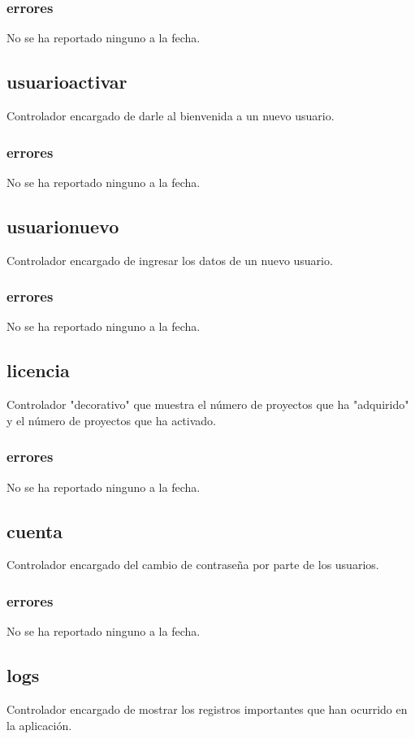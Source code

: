 \documentclass[10pt,a4paper]{book}
\begin{document}
	\subsubsection{errores}
	No se ha reportado ninguno a la fecha.

	\subsection{usuarioactivar}
	Controlador encargado de darle al bienvenida a un nuevo usuario.
	\subsubsection{errores}
	No se ha reportado ninguno a la fecha.
	
	\subsection{usuarionuevo}
	Controlador encargado de ingresar los datos de un nuevo usuario.
	\subsubsection{errores}
	No se ha reportado ninguno a la fecha.


	\subsection{licencia}
	Controlador "decorativo" que muestra el número de proyectos que ha "adquirido" y el número de proyectos que ha activado.
	\subsubsection{errores}
	No se ha reportado ninguno a la fecha.

	\subsection{cuenta}
	Controlador encargado del cambio de contraseña por parte de los usuarios.
	\subsubsection{errores}
	No se ha reportado ninguno a la fecha.

	\subsection{logs}
	Controlador encargado de mostrar los registros importantes que han ocurrido en la aplicación.
\end{document}
